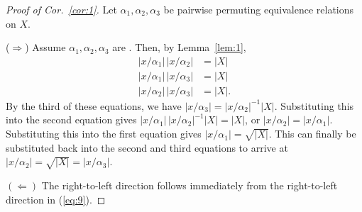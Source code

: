 \begin{proof}[Proof of Cor.~\ref{cor:1}]
Let $\alpha_1, \alpha_2, \alpha_3$ be pairwise permuting equivalence relations
on $X$.

\noindent ($\Rightarrow$)
Assume $\alpha_1, \alpha_2, \alpha_3$ are \pppc. Then, by Lemma~\ref{lem:1},
\begin{align*}
|x/\alpha_1|\, |x/\alpha_2| &= |X|\\
|x/\alpha_1|\, |x/\alpha_3| &= |X|\\
|x/\alpha_2|\, |x/\alpha_3| &= |X|.
\end{align*}
By the third of these equations, we have 
$|x/\alpha_3| = |x/\alpha_2|^{-1} |X|$.
Substituting this into the second equation gives 
$|x/\alpha_1|\, |x/\alpha_2|^{-1} |X| = |X|$,
or $|x/\alpha_2|= |x/\alpha_1|$.
Substituting this into the first equation gives 
$|x/\alpha_1|= \sqrt{|X|}$. This can finally be substituted
back into the second and third
equations to arrive at $|x/\alpha_2|= \sqrt{|X|} = |x/\alpha_3|$.


\noindent $(\Leftarrow)$ The right-to-left direction follows immediately from 
the right-to-left direction in (\ref{eq:9}).
\end{proof}

